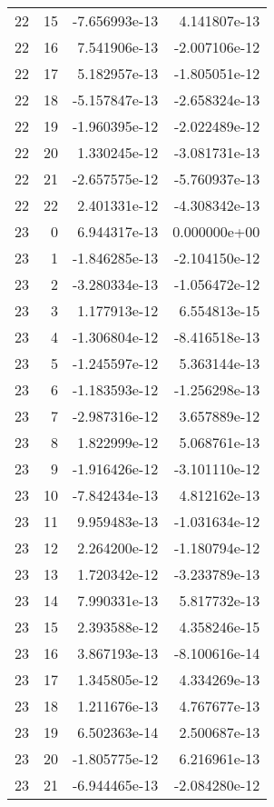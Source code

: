 \begin{tabular}{rrrr}
  22 &   15 & -7.656993e-13 &  4.141807e-13 \\
  22 &   16 &  7.541906e-13 & -2.007106e-12 \\
  22 &   17 &  5.182957e-13 & -1.805051e-12 \\
  22 &   18 & -5.157847e-13 & -2.658324e-13 \\
  22 &   19 & -1.960395e-12 & -2.022489e-12 \\
  22 &   20 &  1.330245e-12 & -3.081731e-13 \\
  22 &   21 & -2.657575e-12 & -5.760937e-13 \\
  22 &   22 &  2.401331e-12 & -4.308342e-13 \\
  23 &    0 &  6.944317e-13 &  0.000000e+00 \\
  23 &    1 & -1.846285e-13 & -2.104150e-12 \\
  23 &    2 & -3.280334e-13 & -1.056472e-12 \\
  23 &    3 &  1.177913e-12 &  6.554813e-15 \\
  23 &    4 & -1.306804e-12 & -8.416518e-13 \\
  23 &    5 & -1.245597e-12 &  5.363144e-13 \\
  23 &    6 & -1.183593e-12 & -1.256298e-13 \\
  23 &    7 & -2.987316e-12 &  3.657889e-12 \\
  23 &    8 &  1.822999e-12 &  5.068761e-13 \\
  23 &    9 & -1.916426e-12 & -3.101110e-12 \\
  23 &   10 & -7.842434e-13 &  4.812162e-13 \\
  23 &   11 &  9.959483e-13 & -1.031634e-12 \\
  23 &   12 &  2.264200e-12 & -1.180794e-12 \\
  23 &   13 &  1.720342e-12 & -3.233789e-13 \\
  23 &   14 &  7.990331e-13 &  5.817732e-13 \\
  23 &   15 &  2.393588e-12 &  4.358246e-15 \\
  23 &   16 &  3.867193e-13 & -8.100616e-14 \\
  23 &   17 &  1.345805e-12 &  4.334269e-13 \\
  23 &   18 &  1.211676e-13 &  4.767677e-13 \\
  23 &   19 &  6.502363e-14 &  2.500687e-13 \\
  23 &   20 & -1.805775e-12 &  6.216961e-13 \\
  23 &   21 & -6.944465e-13 & -2.084280e-12 \\

\end{tabular}
